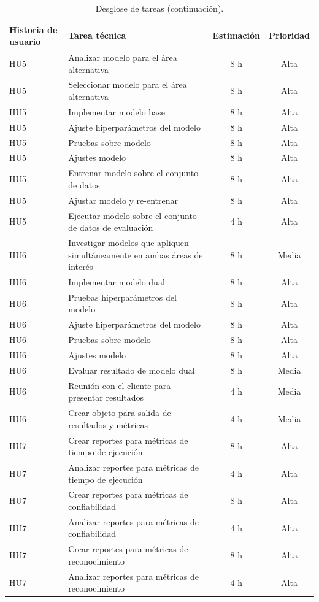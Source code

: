 \documentclass[
11pt, %
]{charter}
\begin{document}
\begin{table}[H]
\caption{Desglose de tareas (continuación).}
\centering
\begin{tabularx}{\linewidth}{@{}|l|X|c|c|@{}}
\hline
\rowcolor[HTML]{C0C0C0}
Historia de usuario & Tarea técnica & Estimación & Prioridad \\ \hline

HU5 & Analizar modelo para el área alternativa & 8 h & Alta \\ \hline
HU5 & Seleccionar modelo para el área alternativa & 8 h & Alta \\ \hline

HU5 & Implementar modelo base & 8 h & Alta \\ \hline
HU5 & Ajuste hiperparámetros del modelo & 8 h & Alta \\ \hline
HU5 & Pruebas sobre modelo & 8 h & Alta \\ \hline
HU5 & Ajustes modelo & 8 h & Alta \\ \hline

HU5 & Entrenar modelo sobre el conjunto de datos & 8 h & Alta \\ \hline
HU5 & Ajustar modelo y re-entrenar & 8 h & Alta \\ \hline

HU5 & Ejecutar modelo sobre el conjunto de datos de evaluación & 4 h & Alta \\ \hline

HU6 & Investigar modelos que apliquen simultáneamente en ambas áreas de interés & 8 h & Media \\ \hline

HU6 & Implementar modelo dual & 8 h & Alta \\ \hline
HU6 & Pruebas hiperparámetros del modelo & 8 h & Alta \\ \hline
HU6 & Ajuste hiperparámetros del modelo & 8 h & Alta \\ \hline
HU6 & Pruebas sobre modelo & 8 h & Alta \\ \hline
HU6 & Ajustes modelo & 8 h & Alta \\ \hline

HU6 & Evaluar resultado de modelo dual & 8 h & Media \\ \hline
HU6 & Reunión con el cliente para presentar resultados & 4 h & Media \\ \hline
HU6 & Crear objeto para salida de resultados y métricas & 4 h & Media \\ \hline

HU7 & Crear reportes para métricas de tiempo de ejecución & 8 h & Alta \\ \hline
HU7 & Analizar reportes para métricas de tiempo de ejecución & 4 h & Alta \\ \hline
HU7 & Crear reportes para métricas de confiabilidad & 8 h & Alta \\ \hline
HU7 & Analizar reportes para métricas de confiabilidad & 4 h & Alta \\ \hline
HU7 & Crear reportes para métricas de reconocimiento & 8 h & Alta \\ \hline
HU7 & Analizar reportes para métricas de reconocimiento & 4 h & Alta \\ \hline


\end{tabularx}
\end{table}
\end{document}
